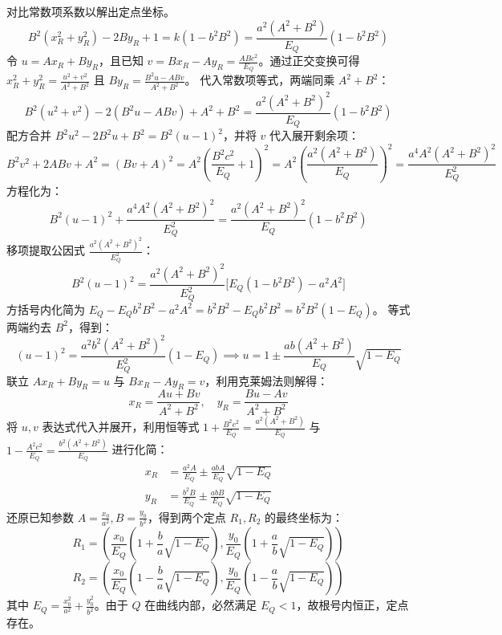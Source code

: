\begin{solution}
对比常数项系数以解出定点坐标。
$$ B^2(x_R^2 + y_R^2) - 2B y_R + 1 = k(1 - b^2 B^2) = \frac{a^2(A^2 + B^2)}{E_Q}(1 - b^2 B^2) $$
令 $u = A x_R + B y_R$，且已知 $v = B x_R - A y_R = \frac{A B c^2}{E_Q}$。通过正交变换可得 $x_R^2 + y_R^2 = \frac{u^2 + v^2}{A^2 + B^2}$ 且 $B y_R = \frac{B^2 u - A B v}{A^2 + B^2}$。
代入常数项等式，两端同乘 $A^2 + B^2$：
$$ B^2(u^2 + v^2) - 2(B^2 u - A B v) + A^2 + B^2 = \frac{a^2(A^2 + B^2)^2}{E_Q}(1 - b^2 B^2) $$
配方合并 $B^2 u^2 - 2B^2 u + B^2 = B^2(u-1)^2$，并将 $v$ 代入展开剩余项：
$$ B^2 v^2 + 2 A B v + A^2 = (B v + A)^2 = A^2 \left( \frac{B^2 c^2}{E_Q} + 1 \right)^2 = A^2 \left( \frac{a^2(A^2 + B^2)}{E_Q} \right)^2 = \frac{a^4 A^2(A^2 + B^2)^2}{E_Q^2} $$
方程化为：
$$ B^2(u-1)^2 + \frac{a^4 A^2(A^2 + B^2)^2}{E_Q^2} = \frac{a^2(A^2 + B^2)^2}{E_Q}(1 - b^2 B^2) $$
移项提取公因式 $\frac{a^2(A^2 + B^2)^2}{E_Q^2}$：
$$ B^2(u-1)^2 = \frac{a^2(A^2 + B^2)^2}{E_Q^2} \big[ E_Q(1 - b^2 B^2) - a^2 A^2 \big] $$
方括号内化简为 $E_Q - E_Q b^2 B^2 - a^2 A^2 = b^2 B^2 - E_Q b^2 B^2 = b^2 B^2 (1 - E_Q)$。
等式两端约去 $B^2$，得到：
$$ (u-1)^2 = \frac{a^2 b^2 (A^2 + B^2)^2}{E_Q^2} (1 - E_Q) \implies u = 1 \pm \frac{a b (A^2 + B^2)}{E_Q} \sqrt{1 - E_Q} $$
联立 $A x_R + B y_R = u$ 与 $B x_R - A y_R = v$，利用克莱姆法则解得：
$$ x_R = \frac{A u + B v}{A^2 + B^2}, \quad y_R = \frac{B u - A v}{A^2 + B^2} $$
将 $u, v$ 表达式代入并展开，利用恒等式 $1 + \frac{B^2 c^2}{E_Q} = \frac{a^2(A^2+B^2)}{E_Q}$ 与 $1 - \frac{A^2 c^2}{E_Q} = \frac{b^2(A^2+B^2)}{E_Q}$ 进行化简：
\begin{align*}
x_R &= \frac{a^2 A}{E_Q} \pm \frac{a b A}{E_Q} \sqrt{1 - E_Q} \\
y_R &= \frac{b^2 B}{E_Q} \pm \frac{a b B}{E_Q} \sqrt{1 - E_Q}
\end{align*}
还原已知参数 $A = \frac{x_0}{a^2}, B = \frac{y_0}{b^2}$，得到两个定点 $R_1, R_2$ 的最终坐标为：
$$ R_1 = \left( \frac{x_0}{E_Q} \left( 1 + \frac{b}{a} \sqrt{1 - E_Q} \right), \frac{y_0}{E_Q} \left( 1 + \frac{a}{b} \sqrt{1 - E_Q} \right) \right) $$
$$ R_2 = \left( \frac{x_0}{E_Q} \left( 1 - \frac{b}{a} \sqrt{1 - E_Q} \right), \frac{y_0}{E_Q} \left( 1 - \frac{a}{b} \sqrt{1 - E_Q} \right) \right) $$
其中 $E_Q = \frac{x_0^2}{a^2} + \frac{y_0^2}{b^2}$。由于 $Q$ 在曲线内部，必然满足 $E_Q < 1$，故根号内恒正，定点存在。
\end{solution}


